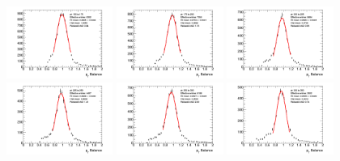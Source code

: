 \begin{figure}[htb!]
    \centering
    \includegraphics[width=0.31\textwidth]{plots/insitu/fits_data_zmm_nominal/Zmmjet_Nominal_Bin2.png}
    \includegraphics[width=0.31\textwidth]{plots/insitu/fits_data_zmm_nominal/Zmmjet_Nominal_Bin3.png}
    \includegraphics[width=0.31\textwidth]{plots/insitu/fits_data_zmm_nominal/Zmmjet_Nominal_Bin4.png}
    \includegraphics[width=0.31\textwidth]{plots/insitu/fits_data_zmm_nominal/Zmmjet_Nominal_Bin5.png}
    \includegraphics[width=0.31\textwidth]{plots/insitu/fits_data_zmm_nominal/Zmmjet_Nominal_Bin6.png}
    \includegraphics[width=0.31\textwidth]{plots/insitu/fits_data_zmm_nominal/Zmmjet_Nominal_Bin7.png}

\end{figure}
